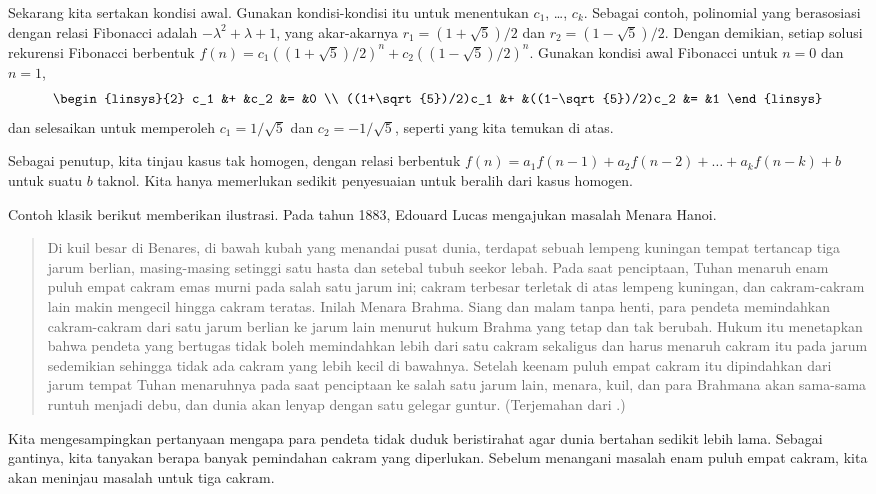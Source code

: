 Sekarang kita sertakan kondisi awal.
Gunakan kondisi-kondisi itu untuk menentukan $c_1$, \ldots, $c_k$.
Sebagai contoh, polinomial yang berasosiasi dengan relasi Fibonacci adalah
$-\lambda^2+\lambda+1$, yang akar-akarnya $r_1=(1+\sqrt{5})/2$ dan
$r_2=(1-\sqrt{5})/2$. Dengan demikian, setiap solusi rekurensi Fibonacci
berbentuk $f(n)=c_1((1+\sqrt{5})/2)^n+c_2((1-\sqrt{5})/2)^n$.
Gunakan kondisi awal Fibonacci untuk $n=0$ dan $n=1$,
\begin{equation*}
  \begin{linsys}{2}
    c_1               &+  &c_2               &=  &0  \\
    ((1+\sqrt{5})/2)c_1 &+  &((1-\sqrt{5})/2)c_2 &=  &1
  \end{linsys}
\end{equation*}
dan selesaikan untuk memperoleh $c_1=1/\sqrt{5}$ dan
$c_2=-1/\sqrt{5}$, seperti yang kita temukan di atas.

Sebagai penutup, kita tinjau kasus tak homogen, dengan relasi berbentuk
$f(n)=a_1f(n-1)+a_2f(n-2)+\dots+a_kf(n-k)+b$ untuk suatu $b$ taknol.
Kita hanya memerlukan sedikit penyesuaian untuk beralih dari kasus homogen.

Contoh klasik berikut memberikan ilustrasi.
Pada tahun 1883, Edouard Lucas mengajukan masalah
Menara Hanoi.
\begin{quotation}
  \noindent
  Di kuil besar di Benares, di bawah kubah yang menandai pusat dunia,
  terdapat sebuah lempeng kuningan tempat tertancap tiga jarum berlian,
  masing-masing setinggi satu hasta dan setebal tubuh seekor lebah.
  Pada saat penciptaan, Tuhan menaruh enam puluh empat cakram emas murni
  pada salah satu jarum ini; cakram terbesar terletak di atas lempeng
  kuningan, dan cakram-cakram lain makin mengecil hingga cakram teratas.
  Inilah Menara Brahma.
  Siang dan malam tanpa henti, para pendeta memindahkan cakram-cakram dari
  satu jarum berlian ke jarum lain menurut hukum Brahma yang tetap dan tak
  berubah. Hukum itu menetapkan bahwa pendeta yang bertugas tidak boleh
  memindahkan lebih dari satu cakram sekaligus dan harus menaruh cakram itu
  pada jarum sedemikian sehingga tidak ada cakram yang lebih kecil di
  bawahnya.
  Setelah keenam puluh empat cakram itu dipindahkan dari jarum tempat Tuhan
  menaruhnya pada saat penciptaan ke salah satu jarum lain, menara, kuil,
  dan para Brahmana akan sama-sama runtuh menjadi debu, dan dunia akan lenyap
  dengan satu gelegar guntur.
  (Terjemahan \cite{DeParville} dari \cite{Ball}.)
\end{quotation}
Kita mengesampingkan pertanyaan mengapa para pendeta tidak duduk beristirahat
agar dunia bertahan sedikit lebih lama. Sebagai gantinya, kita tanyakan berapa
banyak pemindahan cakram yang diperlukan.
Sebelum menangani masalah enam puluh empat cakram, kita akan meninjau masalah
untuk tiga cakram.

